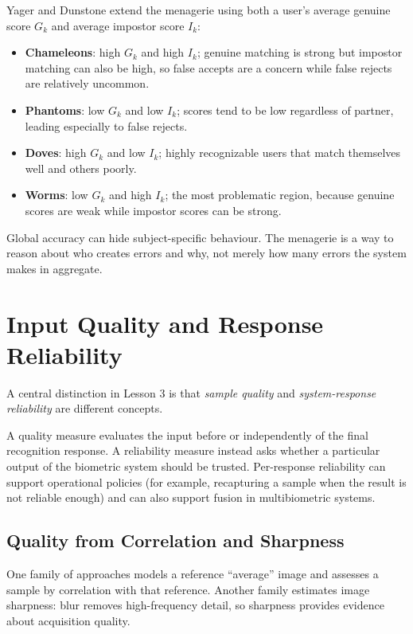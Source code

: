 \documentclass[11pt,a4paper,oneside]{report}
\begin{document}
Yager and Dunstone extend the menagerie using both a user's average genuine
score $G_k$ and average impostor score $I_k$:
\begin{itemize}
    \item \textbf{Chameleons}: high $G_k$ and high $I_k$; genuine matching is
          strong but impostor matching can also be high, so false accepts are a
          concern while false rejects are relatively uncommon.
    \item \textbf{Phantoms}: low $G_k$ and low $I_k$; scores tend to be low
          regardless of partner, leading especially to false rejects.
    \item \textbf{Doves}: high $G_k$ and low $I_k$; highly recognizable users
          that match themselves well and others poorly.
    \item \textbf{Worms}: low $G_k$ and high $I_k$; the most problematic region,
          because genuine scores are weak while impostor scores can be strong.
\end{itemize}

\begin{keyconcept}
Global accuracy can hide subject-specific behaviour.  The menagerie is a way to
reason about who creates errors and why, not merely how many errors the system
makes in aggregate.
\end{keyconcept}

\section{Input Quality and Response Reliability}
\label{sec:quality-vs-reliability}

A central distinction in Lesson 3 is that \emph{sample quality} and
\emph{system-response reliability} are different concepts.

A quality measure evaluates the input before or independently of the final
recognition response.  A reliability measure instead asks whether a particular
output of the biometric system should be trusted.  Per-response reliability can
support operational policies (for example, recapturing a sample when the result
is not reliable enough) and can also support fusion in multibiometric systems.

\subsection{Quality from Correlation and Sharpness}

One family of approaches models a reference ``average'' image and assesses a
sample by correlation with that reference.  Another family estimates image
sharpness: blur removes high-frequency detail, so sharpness provides evidence
about acquisition quality.
\end{document}
